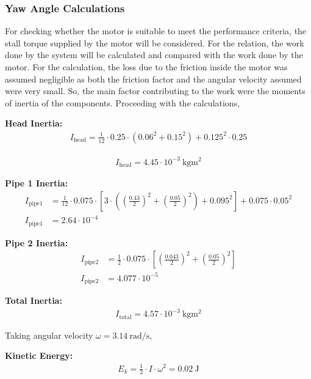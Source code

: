 \documentclass[12pt]{article}
\begin{document}
\subsubsection{Yaw Angle Calculations}

For checking whether the motor is suitable to meet the performance criteria, the stall torque supplied by the motor will be considered. For the relation, the work done by the system will be calculated and compared with the work done by the motor. For the calculation, the loss due to the friction inside the motor was assumed negligible as both the friction factor and the angular velocity assumed were very small. So, the main factor contributing to the work were the moments of inertia of the components. Proceeding with the calculations,

\textbf{Head Inertia:}
\begin{align}
I_\text{head} = \frac{1}{12} \cdot 0.25 \cdot \left(0.06^2 + 0.15^2\right) + 0.125^2 \cdot 0.25
\end{align}

\begin{align}
I_\text{head} = 4.45 \cdot 10^{-3}\ \si{\kilogram\meter\squared}
\end{align}

\textbf{Pipe 1 Inertia:}
\begin{align}
I_\text{pipe1} &= \frac{1}{12} \cdot 0.075 \cdot \left[ 3 \cdot \left( \left(\frac{0.43}{2}\right)^2 + \left(\frac{0.05}{2}\right)^2 \right) + 0.095^2 \right] + 0.075 \cdot 0.05^2
\\
I_\text{pipe1} &= 2.64 \cdot 10^{-4}
\end{align}

\textbf{Pipe 2 Inertia:}
\begin{align}
I_\text{pipe2} &= \frac{1}{2} \cdot 0.075 \cdot \left[ \left(\frac{0.043}{2}\right)^2 + \left(\frac{0.05}{2}\right)^2 \right]
\\
I_\text{pipe2} &= 4.077 \cdot 10^{-5}
\end{align}

\textbf{Total Inertia:}
\begin{align}
I_\text{total} = 4.57 \cdot 10^{-3}\ \si{\kilogram\meter\squared}
\end{align}

Taking angular velocity \(\omega = 3.14\ \si{\radian\per\second}\),

\textbf{Kinetic Energy:}
\begin{align}
E_k = \frac{1}{2} \cdot I \cdot \omega^2 = 0.02\ \si{\joule}
\end{align}
\end{document}
